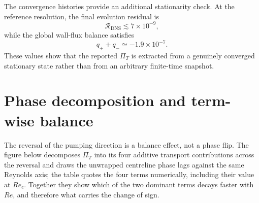 \documentclass[12pt,a4paper]{article}
\newcommand{\Rey}{\mathit{Re}}
\newcommand{\PiT}{\Pi_T}
\begin{document}
The convergence histories provide an additional stationarity check. At the
reference resolution, the final evolution residual is
\begin{equation}
\mathcal{R}_{\mathrm{DNS}}\lesssim 7\times10^{-9},
\end{equation}
while the global wall-flux balance satisfies
\begin{equation}
q_+ + q_-
\simeq -1.9\times10^{-7}.
\end{equation}
These values show that the reported $\PiT$ is extracted from a genuinely
converged stationary state rather than from an arbitrary finite-time snapshot.

\section{Phase decomposition and term-wise balance}
\label{sec:phase_balance}
The reversal of the pumping direction is a balance effect, not a phase flip. The
figure below decomposes $\PiT$ into its four additive transport contributions
across the reversal and draws the unwrapped centreline phase lags against the
same Reynolds axis; the table quotes the four terms numerically, including their
value at $\Rey_c$. Together they show which of the two dominant terms decays
faster with $\Rey$, and therefore what carries the change of sign.
\end{document}
